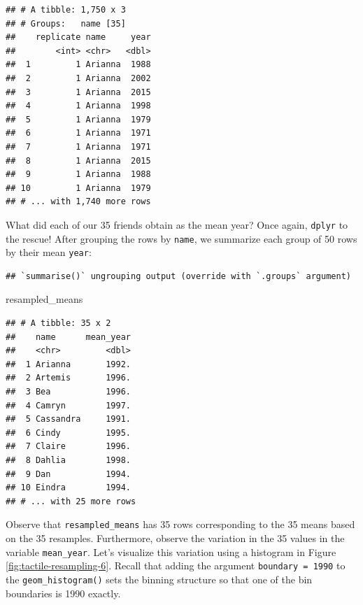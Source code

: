 \documentclass[
]{book}
\newenvironment{Shaded}{\begin{snugshade}}{\end{snugshade}}
\newcommand{\DataTypeTok}[1]{\textcolor[rgb]{0.13,0.29,0.53}{#1}}
\newcommand{\KeywordTok}[1]{\textcolor[rgb]{0.13,0.29,0.53}{\textbf{#1}}}
\newcommand{\NormalTok}[1]{#1}
\newcommand{\OperatorTok}[1]{\textcolor[rgb]{0.81,0.36,0.00}{\textbf{#1}}}
\newcommand{\StringTok}[1]{\textcolor[rgb]{0.31,0.60,0.02}{#1}}
\begin{document}
\begin{verbatim}
## # A tibble: 1,750 x 3
## # Groups:   name [35]
##    replicate name     year
##        <int> <chr>   <dbl>
##  1         1 Arianna  1988
##  2         1 Arianna  2002
##  3         1 Arianna  2015
##  4         1 Arianna  1998
##  5         1 Arianna  1979
##  6         1 Arianna  1971
##  7         1 Arianna  1971
##  8         1 Arianna  2015
##  9         1 Arianna  1988
## 10         1 Arianna  1979
## # ... with 1,740 more rows
\end{verbatim}

What did each of our 35 friends obtain as the mean year? Once again, \texttt{dplyr} to the rescue! After grouping the rows by \texttt{name}, we summarize each group of 50 rows by their mean \texttt{year}:

\begin{Shaded}
\end{Shaded}

\begin{verbatim}
## `summarise()` ungrouping output (override with `.groups` argument)
\end{verbatim}

\begin{Shaded}
\begin{Highlighting}[]
\NormalTok{resampled_means}
\end{Highlighting}
\end{Shaded}

\begin{verbatim}
## # A tibble: 35 x 2
##    name      mean_year
##    <chr>         <dbl>
##  1 Arianna       1992.
##  2 Artemis       1996.
##  3 Bea           1996.
##  4 Camryn        1997.
##  5 Cassandra     1991.
##  6 Cindy         1995.
##  7 Claire        1996.
##  8 Dahlia        1998.
##  9 Dan           1994.
## 10 Eindra        1994.
## # ... with 25 more rows
\end{verbatim}

Observe that \texttt{resampled\_means} has 35 rows corresponding to the 35 means based on the 35 resamples. Furthermore, observe the variation in the 35 values in the variable \texttt{mean\_year}. Let's visualize this variation using a histogram in Figure \ref{fig:tactile-resampling-6}. Recall that adding the argument \texttt{boundary\ =\ 1990} to the \texttt{geom\_histogram()} sets the binning structure so that one of the bin boundaries is 1990 exactly.
\end{document}
